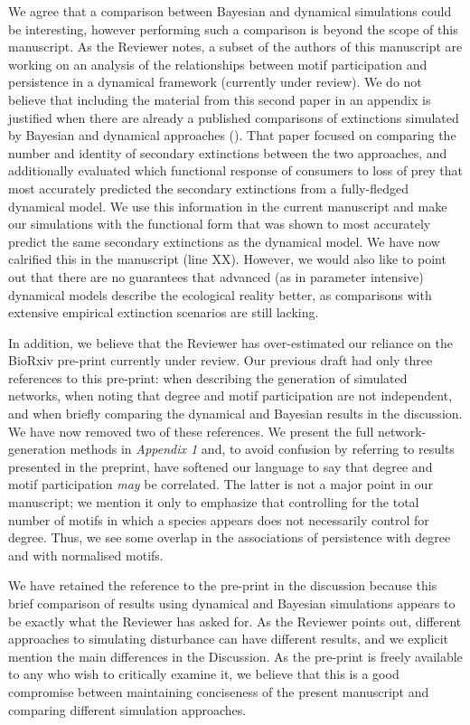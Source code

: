 \documentclass[12pt]{article}
\newcommand{\us}{\rm \setlength{\leftskip}{0.3cm} \setlength{\rightskip}{0.3cm}}
\begin{document}
        \us We agree that a comparison between Bayesian and dynamical simulations could be interesting, however performing such a comparison is beyond the scope of this manuscript. As the Reviewer notes, a subset of the authors of this manuscript are working on an analysis of the relationships between motif participation and persistence in a dynamical framework (currently under review). We do not believe that including the material from this second paper in an appendix is justified when there are already a published comparisons of extinctions simulated by Bayesian and dynamical approaches (\citealp[]{Eklof2013a}). That paper focused on comparing the number and identity of secondary extinctions between the two approaches, and additionally evaluated which functional response of consumers to loss of prey that most accurately predicted the secondary extinctions from a fully-fledged dynamical model. We use this information in the current manuscript and make our simulations with the functional form that was shown to most accurately predict the same secondary extinctions as the dynamical model. We have now calrified this in the manuscript (line XX). However, we would also like to point out that there are no guarantees that advanced (as in parameter intensive) dynamical models describe the ecological reality better, as comparisons with extensive empirical extinction scenarios are still lacking.     
        
        
        In addition, we believe that the Reviewer has over-estimated our reliance on the BioRxiv pre-print currently under review. Our previous draft had only three references to this pre-print: when describing the generation of simulated networks, when noting that degree and motif participation are not independent, and when briefly comparing the dynamical and Bayesian results in the discussion.
        We have now removed two of these references.
        We present the full network-generation methods in \emph{Appendix 1} and, to avoid confusion by referring to results presented in the preprint, have softened our language to say that degree and motif participation \emph{may} be correlated. 
        The latter is not a major point in our manuscript; we mention it only to emphasize that controlling for the total number of motifs in which a species appears does not necessarily control for degree. 
        Thus, we see some overlap in the associations of persistence with degree and with normalised motifs.
        
        
        We have retained the reference to the pre-print in the discussion because this brief comparison of results using dynamical and Bayesian simulations appears to be exactly what the Reviewer has asked for.
        As the Reviewer points out, different approaches to simulating disturbance can have different results, and we explicit mention the main differences in the Discussion. 
        As the pre-print is freely available to any who wish to critically examine it, we believe that this is a good compromise between maintaining conciseness of the present manuscript and comparing different simulation approaches.
        
\end{document}
